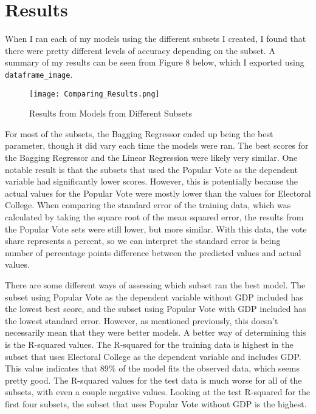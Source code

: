 \documentclass[12pt]{article}
\begin{document}
\section*{Results}

When I ran each of my models using the different subsets I created, I found that there were pretty different levels of accuracy depending on the subset. A summary of my results can be seen from Figure 8 below, which I exported using \verb|dataframe_image|.

\begin{figure}[H]
    \centering
    \texttt{[image: Comparing\_Results.png]}
    \caption{Results from Models from Different Subsets}
\end{figure}

For most of the subsets, the Bagging Regressor ended up being the best parameter, though it did vary each time the models were ran. The best scores for the Bagging Regressor and the Linear Regression were likely very similar. One notable result is that the subsets that used the Popular Vote as the dependent variable had significantly lower scores. However, this is potentially because the actual values for the Popular Vote were mostly lower than the values for Electoral College. When comparing the standard error of the training data, which was calculated by taking the square root of the mean squared error, the results from the Popular Vote sets were still lower, but more similar. With this data, the vote share represents a percent, so we can interpret the standard error is being number of percentage points difference between the predicted values and actual values. 

\vspace{3.00mm}

There are some different ways of assessing which subset ran the best model. The subset using Popular Vote as the dependent variable without GDP included has the lowest best score, and the subset using Popular Vote with GDP included has the lowest standard error. However, as mentioned previously, this doesn't necessarily mean that they were better models. A better way of determining this is the R-squared values. The R-squared for the training data is highest in the subset that uses Electoral College as the dependent variable and includes GDP. This value indicates that 89\% of the model fits the observed data, which seems pretty good. The R-squared values for the test data is much worse for all of the subsets, with even a couple negative values. Looking at the test R-squared for the first four subsets, the subset that uses Popular Vote without GDP is the highest.
\end{document}
